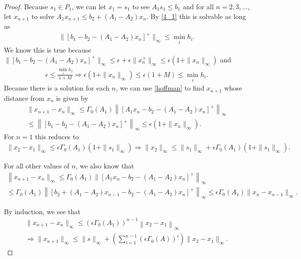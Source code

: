 \documentclass{article}
\theoremstyle{case}
\numberwithin{theorem}{subsection}
\newcommand{\huff}{{\Gamma_0}}
\begin{document}
\begin{proof}
Because $s_1 \in P_1$, we can let $x_1 = s_1$ to see $A_1s_1 \le b_1$
and for all $n = 2, 3, \ldots$, let $x_{n+1}$ to solve
$A_1 x_{n+1} \le b_2 + (A_1 - A_2) x_n$.
By \cref{4_1} this is solvable as long as
\begin{align*}
\|[b_1 - b_2 - (A_1 - A_2)x_n]^+\|_\infty \le \min_i h_i.
\end{align*}
We know this is true because $\|[b_1 - b_2 - (A_1 - A_2)x_n]^+\|_{\infty} \le \epsilon + \epsilon\| x_n^+\|_{\infty} \le \epsilon(1 + \|x_n\|_\infty)$
and
\begin{align*}
\epsilon \le \frac{\min_i h_i}{1 + M} \Longrightarrow
\epsilon(1 + \|x_n\|_\infty) \le \epsilon(1 + M) \le \min_i h_i.
\end{align*}
Because there is a solution for each $n$, we can use \cref{hoffman} to find $x_{n+1}$ whose distance from $x_n$ is given by
\begin{align*}
\|x_{n+1} - x_n\|_\infty \le \huff(A_1) \left\|[A_1x_n - b_2 - (A_1 - A_2)x_n]^+\right\|_\infty \\
\le \left\|[b_1 - b_2 - (A_1 - A_2)x_n]^+\right\|_\infty\le \epsilon(1 + \|x_n\|_\infty).
\end{align*}
For $n=1$ this reduces to
\begin{align*}
\|x_2 - x_1\|_\infty \le \epsilon\huff(A_1)  (1 + \|s_1\|_\infty)
\Longrightarrow \|x_2\|_\infty \le \|s_1\| _\infty+ \epsilon\huff(A_1)(1 + \|s_1\|_\infty).
\end{align*}

For all other values of $n$, we also know that
\begin{align*}
\left\|x_{n+1} - x_{n}\|_\infty \le \huff(A_1)\|[A_1x_n - b_2 - (A_1 - A_2)x_n]^+\right\|_\infty \\
\le \huff(A_1)\left\|[b_2 + (A_1 - A_2)x_{n-1} - b_2 - (A_1 - A_2)x_n]^+\right\|_\infty
\le \epsilon \huff(A_1)  \|x_{n}-x_{n-1}\|_\infty.
\end{align*}

By induction, we see that
\begin{align*}
\|x_{n+1} - x_n\|_\infty \le \left(\epsilon\huff(A_1)\right)^{n-1}\left\|x_2 - x_1\right\|_\infty \\
\Longrightarrow \|x_{n+1}\|_\infty \le \|s\|_\infty + \left( \sum_{i=1}^{n-1}( \epsilon\huff(A))^i\right) \|x_2 - x_1\|_\infty .
\end{align*}


\end{proof}
\end{document}
